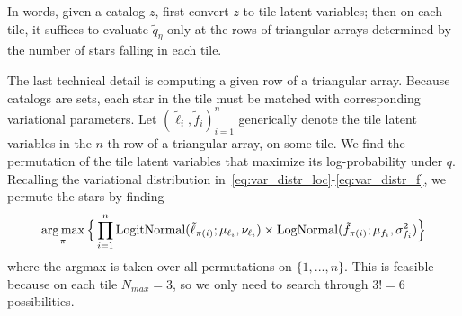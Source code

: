 In words, given a catalog $z$,
first convert $z$ to tile latent variables;
then on each tile, it suffices to evaluate $\tilde q_\eta$ only at the rows of triangular 
arrays determined by the number 
of stars falling in each tile. 

The last technical detail is computing 
a given row of a triangular array. 
Because catalogs are sets,
each star in the tile must 
be matched with corresponding variational parameters. 
Let $(\tilde \ell_i, \tilde f_i)_{i = 1}^n$ generically denote the tile latent variables in the $n$-th row of a triangular array, on some tile. 
We find the permutation of the tile latent variables that maximize its log-probability under $q$. 
Recalling the variational distribution in~\eqref{eq:var_distr_loc}-\eqref{eq:var_distr_f}, we permute the stars by finding 
\begin{align}
    \operatorname*{arg\,max}_\pi \Big\{ \prod_{i=1}^n \text{LogitNormal}(\tilde \ell_{\pi(i)}; \mu_{\ell_{i}}, \nu_{\ell_{i}})\times 
	\text{LogNormal}(\tilde f_{\pi(i)}; \mu_{f_{i}}, \sigma^2_{f_{i}})\Big\}
\end{align}
where the argmax is taken over all permutations on $\{1, ..., n\}$. This is feasible because on each tile $N_{max} = 3$, so we only need to search through $3!=6$ possibilities. 